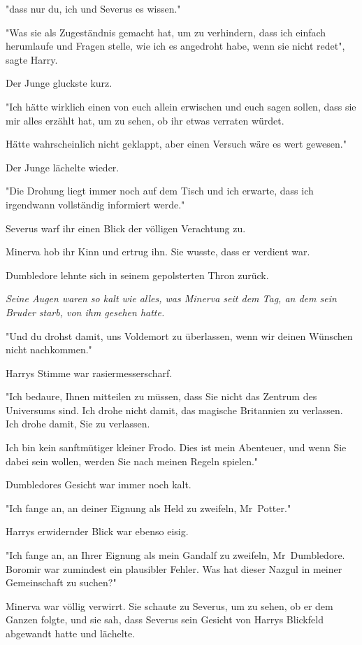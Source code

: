 {"dass nur du, ich und Severus es wissen."

"Was sie als Zugeständnis gemacht hat, um zu verhindern, dass ich einfach herumlaufe und Fragen stelle, wie ich es angedroht habe, wenn sie nicht redet", sagte Harry.

Der Junge gluckste kurz.

"Ich hätte wirklich einen von euch allein erwischen und euch sagen sollen, dass sie mir alles erzählt hat, um zu sehen, ob ihr etwas verraten würdet.

Hätte wahrscheinlich nicht geklappt, aber einen Versuch wäre es wert gewesen."

Der Junge lächelte wieder.

"Die Drohung liegt immer noch auf dem Tisch und ich erwarte, dass ich irgendwann vollständig informiert werde."

Severus warf ihr einen Blick der völligen Verachtung zu.

Minerva hob ihr Kinn und ertrug ihn. Sie wusste, dass er verdient war.

Dumbledore lehnte sich in seinem gepolsterten Thron zurück.

\emph{Seine Augen waren so kalt wie alles, was Minerva seit dem Tag, an dem sein Bruder starb, von ihm gesehen hatte.}

"Und du drohst damit, uns Voldemort zu überlassen, wenn wir deinen Wünschen nicht nachkommen."

Harrys Stimme war rasiermesserscharf.

"Ich bedaure, Ihnen mitteilen zu müssen, dass Sie nicht das Zentrum des Universums sind. Ich drohe nicht damit, das magische Britannien zu verlassen. Ich drohe damit, Sie zu verlassen.

Ich bin kein sanftmütiger kleiner Frodo. Dies ist mein Abenteuer, und wenn Sie dabei sein wollen, werden Sie nach meinen Regeln spielen."

Dumbledores Gesicht war immer noch kalt.

"Ich fange an, an deiner Eignung als Held zu zweifeln, Mr~Potter."

Harrys erwidernder Blick war ebenso eisig.

"Ich fange an, an Ihrer Eignung als mein Gandalf zu zweifeln, Mr~Dumbledore. Boromir war zumindest ein plausibler Fehler. Was hat dieser Nazgul in meiner Gemeinschaft zu suchen?"

Minerva war völlig verwirrt. Sie schaute zu Severus, um zu sehen, ob er dem Ganzen folgte, und sie sah, dass Severus sein Gesicht von Harrys Blickfeld abgewandt hatte und lächelte.

}

